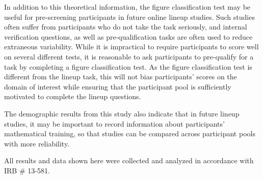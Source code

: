 \documentclass[journal]{vgtc}\usepackage[]{graphicx}\usepackage[]{color}
\begin{document}
In addition to this theoretical information, the figure classification test may be useful for pre-screening participants in future online lineup studies.
Such studies often suffer from participants who do not take the task seriously, and internal verification questions, as well as pre-qualification tasks are often used to reduce extraneous variability.
While it is impractical to require participants to score well on several different tests, it is reasonable to ask participants to pre-qualify for a task by completing a figure classification test.
As the figure classification test is different from the lineup task, this will not bias participants' scores on the domain of interest while ensuring that the participant pool is sufficiently motivated to complete the lineup questions.

The demographic results from this study also indicate that in future lineup studies, it may be important to record information about participants' mathematical training, so that studies can be compared across participant pools with more reliability. 

All results and data shown here were collected and analyzed in accordance with IRB \# 13-581.


\end{document}
